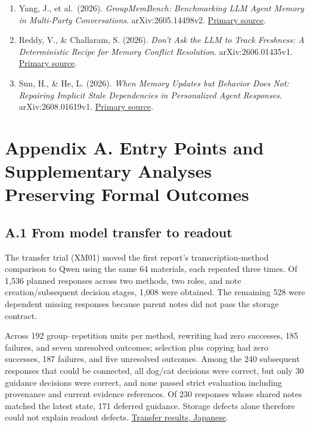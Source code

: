 \documentclass[10pt,a4paper]{article}
\begin{document}
\begin{enumerate}
\item
  Yang, J., et al.~(2026). \emph{GroupMemBench: Benchmarking LLM Agent Memory in Multi-Party Conversations}. arXiv:2605.14498v2. \href{https://arxiv.org/abs/2605.14498v2}{Primary source}.
\item
  Reddy, V., \& Challaram, S. (2026). \emph{Don't Ask the LLM to Track Freshness: A Deterministic Recipe for Memory Conflict Resolution}. arXiv:2606.01435v1. \href{https://arxiv.org/abs/2606.01435v1}{Primary source}.
\item
  Sun, H., \& He, L. (2026). \emph{When Memory Updates but Behavior Does Not: Repairing Implicit Stale Dependencies in Personalized Agent Responses}. arXiv:2608.01619v1. \href{https://arxiv.org/abs/2608.01619v1}{Primary source}.
\end{enumerate}

\endgroup

\clearpage

\section{Appendix A. Entry Points and Supplementary Analyses Preserving Formal Outcomes}\label{paper-02-appendix-a.-entry-points-and-supplementary-analyses-preserving-formal-outcomes}

\subsection{A.1 From model transfer to readout}\label{paper-02-a.1-from-model-transfer-to-readout}

The transfer trial (XM01) moved the first report's transcription-method comparison to Qwen using the same 64 materials, each repeated three times. Of 1,536 planned responses across two methods, two roles, and note creation/subsequent decision stages, 1,008 were obtained. The remaining 528 were dependent missing responses because parent notes did not pass the storage contract.

Across 192 group--repetition units per method, rewriting had zero successes, 185 failures, and seven unresolved outcomes; selection plus copying had zero successes, 187 failures, and five unresolved outcomes. Among the 240 subsequent responses that could be connected, all dog/cat decisions were correct, but only 30 guidance decisions were correct, and none passed strict evaluation including provenance and current evidence references. Of 230 responses whose shared notes matched the latest state, 171 deferred guidance. Storage defects alone therefore could not explain readout defects. \href{https://github.com/metaSATOKEN/MRSI/blob/9443de315d283874df0c27e0e99b8c04f400709d/experiments/XM01/docs/cross-model-e1-01-result-2026-09-25.md}{Transfer results, Japanese}.
\end{document}
